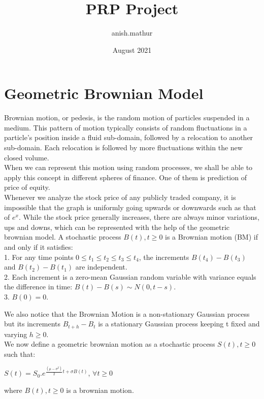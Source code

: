 \documentclass{article}
\title{PRP Project}
\author{anish.mathur }
\date{August 2021}
\begin{document}
\maketitle
\section{Geometric Brownian Model}

    Brownian motion, or pedesis, is the random motion of particles suspended in a medium. This pattern of motion typically consists of random fluctuations in a particle's position inside a fluid sub-domain, followed by a relocation to another sub-domain. Each relocation is followed by more fluctuations within the new closed volume.\\ 
    When we can represent this motion using random processes, we shall be able to apply this concept in different spheres of finance. One of them is prediction of price of equity.\\
    Whenever we analyze the stock price of any publicly traded company, it is impossible that the graph is uniformly going upwards or downwards such as that of $e^x$. While the stock price generally increases, there are always minor variations, ups and downs, which can be represented with the help of the geometric brownian model.
    A stochastic process ${B(t),t \ge 0}$ is a Brownian motion (BM) if and only if it satisfies:\\
    1. For any time points $0 \le t_1 \le t_2 \le t_3 \le t_4$, the increments $B(t_4) - B(t_3)$ and $B(t_2) - B(t_1)$ are independent.\\
    2. Each increment is a zero-mean Gaussian random variable with variance equals the difference in time:
    $B(t) - B(s) \sim N (0, t - s)$.\\
    3. $B(0) = 0$.
    
    We also notice that the Brownian Motion is a non-stationary Gaussian process but its increments $B_{t+h} - B_t$ is a stationary Gaussian process keeping t fixed and varying $h \ge 0$.\\
    We now define a geometric brownian motion as a stochastic process ${S(t), t \ge 0}$ such that:\\
    \begin{center}
        $S(t) = S_0.e^{\frac{(\mu - \sigma^2)}{2}t + \sigma B(t)}$, $\forall t \ge 0$
    \end{center}
    where ${B(t), t \ge 0}$ is a brownian motion.\\
    
\end{document}
